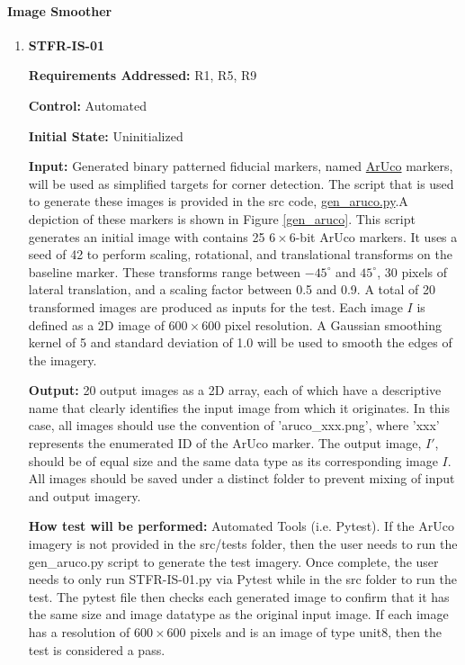 \documentclass[12pt, titlepage]{article}
\begin{document}
\paragraph{Image Smoother}
\begin{enumerate}
\item \hypertarget{STFR-IS-01}{\textbf{STFR-IS-01}}

\textbf{Requirements Addressed:} R1, R5, R9

\textbf{Control:} Automated		

\textbf{Initial State:} Uninitialized

\textbf{Input:} Generated binary patterned fiducial markers, named 
\href{https://docs.opencv.org/4.x/d5/dae/tutorial_aruco_detection.html}
{ArUco} markers, will be used as simplified targets for corner detection. The script that is used to generate these images is provided in the src code, \href{https://github.com/KiranSingh15/CAS-741-Image-Correspondences/blob/main/src/tests/gen_arcuo.py}{gen\_aruco.py}.A depiction of these markers is shown in Figure \ref{gen_aruco}. This script generates an initial image with contains 25 $6\times 6$-bit ArUco markers. It uses a seed of 42 to perform scaling, rotational, and translational transforms on the baseline marker. These transforms range between $-45^\circ$ and $45^\circ$, 30 pixels of lateral translation, and a scaling factor between 0.5 and 0.9. A total of 20 transformed images are produced as inputs for the test. Each image $I$ is defined as a 2D image of $600 \times 600$ pixel resolution. A Gaussian smoothing kernel of 5 and standard deviation of 1.0 will be used to smooth the edges of the imagery. 

\textbf{Output:} 20 output images as a 2D array, each of which have a descriptive name that clearly identifies the input image from which it originates. In this case, all images should use the convention of 'aruco\_xxx.png', where 'xxx' represents the enumerated ID of the ArUco marker. The output image, $I'$, should be of equal size and the same data type as its 
corresponding image $I$. All images should be saved under a distinct folder to prevent mixing of input and output imagery.

\textbf{How test will be performed:} Automated Tools (i.e. Pytest). If the ArUco imagery is not provided in the src/tests folder, then the user needs to run the gen\_aruco.py script to generate the test imagery. Once complete, the user needs to only run STFR-IS-01.py via Pytest while in the src folder to run the test. The pytest file then checks each generated image to confirm that it has the same size and image datatype as the original input image. If each image has a resolution of $600 \times 600$ pixels and is an image of type unit8, then the test is considered a pass.

\end{enumerate}
\end{document}
